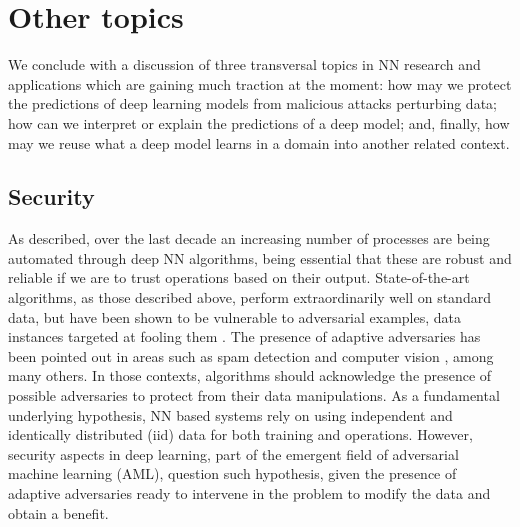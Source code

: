 \section{Other topics}
We conclude with a discussion of three transversal topics in NN
research and applications which are gaining much traction at the moment: how may we protect the predictions of deep
learning models from malicious attacks perturbing data; how can we interpret or explain the predictions of a deep model; and, finally, how may we reuse what a deep model
learns in a domain into another related context. 

\subsection{Security}

As described, over the last decade
an increasing number of processes are being automated through 
deep NN algorithms, being 
essential that these are robust and reliable
if we are to
trust operations based on their output. State-of-the-art
algorithms, as those described above, perform extraordinarily well on standard data,  but have been
shown to be vulnerable to adversarial examples, data instances targeted at
fooling them \cite{goodfellow2014explaining}.
The presence of adaptive adversaries has
been pointed out in areas such as spam detection \cite{zeager2017adversarial}
and computer vision \cite{goodfellow2014explaining}, among many others. 
In those contexts, algorithms should acknowledge the presence of possible adversaries
to protect from their data manipulations.
As a fundamental underlying hypothesis, NN
based systems rely on using 
independent and identically distributed (iid) data for both training and operations. However, security aspects in deep
learning, part of the emergent field of
adversarial machine learning (AML),
question such hypothesis, given the
presence of adaptive adversaries ready to  intervene in the problem 
to modify the data and obtain a benefit. 

